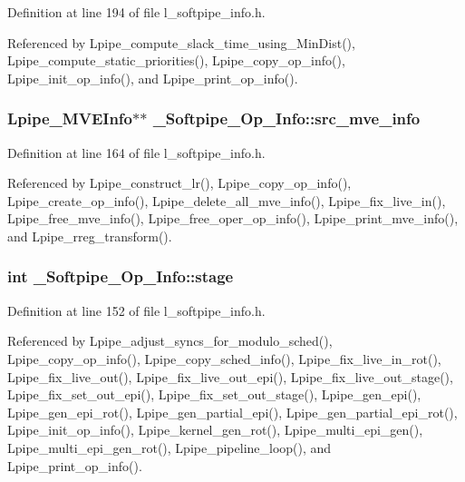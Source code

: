 Definition at line 194 of file l\_\-softpipe\_\-info.h.

Referenced by Lpipe\_\-compute\_\-slack\_\-time\_\-using\_\-Min\-Dist(), Lpipe\_\-compute\_\-static\_\-priorities(), Lpipe\_\-copy\_\-op\_\-info(), Lpipe\_\-init\_\-op\_\-info(), and Lpipe\_\-print\_\-op\_\-info().
\subsubsection{\setlength{\rightskip}{0pt plus 5cm}\bf{Lpipe\_\-MVEInfo}$\ast$$\ast$ \bf{\_\-Softpipe\_\-Op\_\-Info::src\_\-mve\_\-info}}\label{struct__Softpipe__Op__Info_6f7d8b726cd7038e448a61992d256fc8}




Definition at line 164 of file l\_\-softpipe\_\-info.h.

Referenced by Lpipe\_\-construct\_\-lr(), Lpipe\_\-copy\_\-op\_\-info(), Lpipe\_\-create\_\-op\_\-info(), Lpipe\_\-delete\_\-all\_\-mve\_\-info(), Lpipe\_\-fix\_\-live\_\-in(), Lpipe\_\-free\_\-mve\_\-info(), Lpipe\_\-free\_\-oper\_\-op\_\-info(), Lpipe\_\-print\_\-mve\_\-info(), and Lpipe\_\-rreg\_\-transform().
\subsubsection{\setlength{\rightskip}{0pt plus 5cm}int \bf{\_\-Softpipe\_\-Op\_\-Info::stage}}\label{struct__Softpipe__Op__Info_1c69466278e98d42ca7bd8d91916cd93}




Definition at line 152 of file l\_\-softpipe\_\-info.h.

Referenced by Lpipe\_\-adjust\_\-syncs\_\-for\_\-modulo\_\-sched(), Lpipe\_\-copy\_\-op\_\-info(), Lpipe\_\-copy\_\-sched\_\-info(), Lpipe\_\-fix\_\-live\_\-in\_\-rot(), Lpipe\_\-fix\_\-live\_\-out(), Lpipe\_\-fix\_\-live\_\-out\_\-epi(), Lpipe\_\-fix\_\-live\_\-out\_\-stage(), Lpipe\_\-fix\_\-set\_\-out\_\-epi(), Lpipe\_\-fix\_\-set\_\-out\_\-stage(), Lpipe\_\-gen\_\-epi(), Lpipe\_\-gen\_\-epi\_\-rot(), Lpipe\_\-gen\_\-partial\_\-epi(), Lpipe\_\-gen\_\-partial\_\-epi\_\-rot(), Lpipe\_\-init\_\-op\_\-info(), Lpipe\_\-kernel\_\-gen\_\-rot(), Lpipe\_\-multi\_\-epi\_\-gen(), Lpipe\_\-multi\_\-epi\_\-gen\_\-rot(), Lpipe\_\-pipeline\_\-loop(), and Lpipe\_\-print\_\-op\_\-info().
